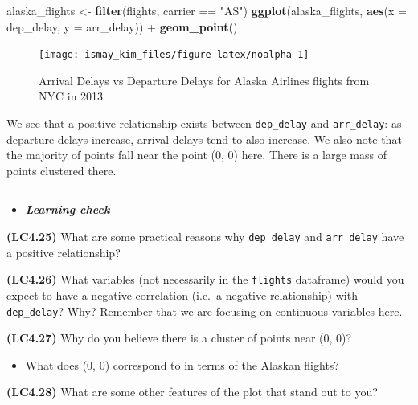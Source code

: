 \documentclass[]{tufte-book}
\newenvironment{Shaded}{\begin{snugshade}}{\end{snugshade}}
\newcommand{\KeywordTok}[1]{\textcolor[rgb]{0.13,0.29,0.53}{\textbf{{#1}}}}
\newcommand{\DataTypeTok}[1]{\textcolor[rgb]{0.13,0.29,0.53}{{#1}}}
\newcommand{\StringTok}[1]{\textcolor[rgb]{0.31,0.60,0.02}{{#1}}}
\newcommand{\NormalTok}[1]{{#1}}
\providecommand{\tightlist}{%
  \setlength{\itemsep}{0pt}\setlength{\parskip}{0pt}}
\newenvironment{rmdblock}[1]
  {\begin{shaded*}
  \begin{itemize}
  \renewcommand{\labelitemi}{
    \raisebox{-.7\height}[0pt][0pt]{
    }
  }
  \item
  }
  {
  \end{itemize}
  \end{shaded*}
  }
\newenvironment{learncheck}
  {\begin{rmdblock}{warning}}
  {\end{rmdblock}}
\begin{document}
\begin{Shaded}
\begin{Highlighting}[]
\NormalTok{alaska_flights <-}\StringTok{ }\KeywordTok{filter}\NormalTok{(flights, carrier ==}\StringTok{ "AS"}\NormalTok{)}
\KeywordTok{ggplot}\NormalTok{(alaska_flights, }\KeywordTok{aes}\NormalTok{(}\DataTypeTok{x =} \NormalTok{dep_delay, }\DataTypeTok{y =} \NormalTok{arr_delay)) +}\StringTok{ }
\StringTok{  }\KeywordTok{geom_point}\NormalTok{()}
\end{Highlighting}
\end{Shaded}

\begin{figure}
\texttt{[image: ismay\_kim\_files/figure-latex/noalpha-1]} \caption[Arrival Delays vs Departure Delays for Alaska Airlines flights from NYC in 2013]{Arrival Delays vs Departure Delays for Alaska Airlines flights from NYC in 2013}\label{fig:noalpha}
\end{figure}

We see that a positive relationship exists between \texttt{dep\_delay}
and \texttt{arr\_delay}: as departure delays increase, arrival delays
tend to also increase. We also note that the majority of points fall
near the point (0, 0) here. There is a large mass of points clustered
there.

\begin{center}\rule{0.5\linewidth}{\linethickness}\end{center}

\begin{learncheck}
\textbf{\emph{Learning check}}
\end{learncheck}

\textbf{(LC4.25)} What are some practical reasons why
\texttt{dep\_delay} and \texttt{arr\_delay} have a positive
relationship?

\textbf{(LC4.26)} What variables (not necessarily in the
\texttt{flights} dataframe) would you expect to have a negative
correlation (i.e.~a negative relationship) with \texttt{dep\_delay}?
Why? Remember that we are focusing on continuous variables here.

\textbf{(LC4.27)} Why do you believe there is a cluster of points near
(0, 0)?

\begin{itemize}
\tightlist
\item
  What does (0, 0) correspond to in terms of the Alaskan flights?
\end{itemize}

\textbf{(LC4.28)} What are some other features of the plot that stand
out to you?
\end{document}
